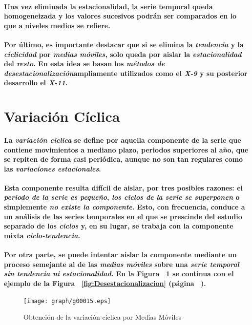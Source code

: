 \paragraph{
Una vez eliminada la estacionalidad, la serie temporal queda homogeneizada y los valores sucesivos podrán ser comparados en lo que a niveles medios se refiere.
}
\paragraph*{
Por último, es importante destacar que si se elimina la \emph{tendencia} y la \emph{ciclicidad} por \emph{medias móviles}, solo queda por aislar la \emph{estacionalidad} del \emph{resto}. En esta idea se basan los \emph{métodos de desestacionalización}\footnotemark[5] ampliamente utilizados como el \emph{X-9} y su posterior desarrollo el \emph{X-11}\cite{SEASONALX11}.
}



\section{Variación Cíclica}
\label{sec:VariacionCiclica}
\paragraph{
La \emph{variación cíclica} se define por aquella componente de la serie que contiene movimientos a mediano plazo, periodos superiores al año, que se repiten de forma casi periódica, aunque no son tan regulares como las \emph{variaciones estacionales}.
}
\paragraph*{
Esta componente resulta difícil de aislar, por tres posibles razones: el \emph{periodo de la serie es pequeño}, \emph{los ciclos de la serie se superponen} o simplemente \emph{no existe la componente}. Esto, con frecuencia, conduce a un análisis de las series temporales en el que se prescinde del estudio separado de los \emph{ciclos} y, en su lugar, se trabaja con la componente mixta \emph{ciclo-tendencia}.
}
\paragraph{
Por otra parte, se puede intentar aislar la componente mediante un proceso semejante al de las \emph{medias móviles} sobre una \emph{serie temporal sin tendencia ni estacionalidad}. En la Figura ~\ref{fig:CiclicidadPorMediasMoviles} se continua con el ejemplo de la Figura ~\ref{fig:Desestacionalizacion} (página ~\pageref{fig:Desestacionalizacion}).
}
\begin{figure}[ht]
\centering
\texttt{[image: graph/g00015.eps]}
\caption[Ciclicidad por Medias Móviles]{Obtención de la variación cíclica por Medias Móviles}
\label{fig:CiclicidadPorMediasMoviles}
\end{figure}



